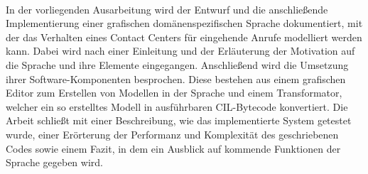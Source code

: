 \kurzfassung

\paragraph*{}
In der vorliegenden Ausarbeitung wird der Entwurf und die anschließende Implementierung einer grafischen domänenspezifischen Sprache dokumentiert, mit der das Verhalten eines Contact Centers für eingehende Anrufe modelliert werden kann. Dabei wird nach einer Einleitung und der Erläuterung der Motivation auf die Sprache und ihre Elemente eingegangen. Anschließend wird die Umsetzung ihrer Software-Komponenten besprochen. Diese bestehen aus einem grafischen Editor zum Erstellen von Modellen in der Sprache und einem Transformator, welcher ein so erstelltes Modell in ausführbaren CIL-Bytecode konvertiert. Die Arbeit schließt mit einer Beschreibung, wie das implementierte System getestet wurde, einer Erörterung der Performanz und Komplexität des geschriebenen Codes sowie einem Fazit, in dem ein Ausblick auf kommende Funktionen der Sprache gegeben wird.